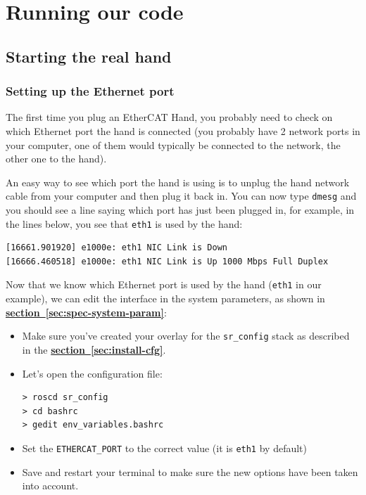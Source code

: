 \documentclass[12pt]{article}
\newcommand{\link}[1]{\hyperref[sec:#1]{\textbf{section~\ref*{sec:#1}}}}
\begin{document}
\newpage

\section{Running our code}
\label{sec:running-our-code}

\subsection{Starting the real hand}
\label{sec:starting-real-hand}

\subsubsection{Setting up the Ethernet port}
\par The first time you plug an EtherCAT Hand, you probably need to check on which Ethernet port the hand is connected (you probably have 2 network ports in your computer, one of them would typically be connected to the network, the other one to the hand).\\

\par An easy way to see which port the hand is using is to unplug the hand network cable from your computer and then plug it back in. You can now type \texttt{dmesg} and you should see a line saying which port has just been plugged in, for example, in the lines below, you see that \texttt{eth1} is used by the hand:
  \begin{lstlisting}[escapeinside='']
[16661.901920] e1000e: eth1 NIC Link is Down
[16666.460518] e1000e: eth1 NIC Link is Up 1000 Mbps Full Duplex
  \end{lstlisting}

\par Now that we know which Ethernet port is used by the hand (\texttt{eth1} in our example), we can edit the interface in the system parameters, as shown in \link{spec-system-param}:
\begin{itemize}
\item Make sure you've created your overlay for the \texttt{sr\_config} stack as described in the \link{install-cfg}.
\item Let's open the configuration file:
  \begin{lstlisting}[escapeinside='']
> roscd sr_config
> cd bashrc
> gedit env_variables.bashrc
  \end{lstlisting}
\item Set the \texttt{ETHERCAT\_PORT} to the correct value (it is \texttt{eth1} by default)
\item Save and restart your terminal to make sure the new options have been taken into account.
\end{itemize}
\end{document}
